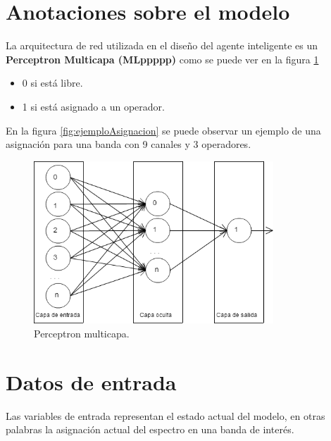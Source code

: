 
\section{Anotaciones sobre el modelo}

La arquitectura de red utilizada en el diseño del agente inteligente es un \textbf{Perceptron Multicapa (MLppppp)} como se puede ver en la figura \ref{fig:perceptronml}


\begin{itemize}
	\item 0 si está libre.
	\item 1 si está asignado a un operador.
\end{itemize}

En la figura \ref{fig:ejemploAsignacion} se puede observar un ejemplo de una asignación para una banda con 9 canales y 3 operadores.

\begin{figure}[H]
	\centering
	\includegraphics[width=9cm]{Capitulo4Modelo/Imagenes/redmlp.png}
	\caption{Perceptron multicapa.}
	\label{fig:perceptronml}	
\end{figure}



\section{Datos de entrada}

Las variables de entrada representan el estado actual del modelo, en otras palabras la asignación actual del espectro en una banda de interés.

